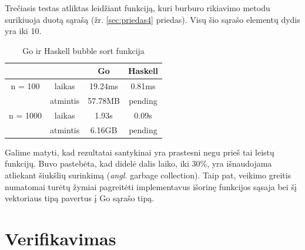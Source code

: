 \documentclass{VUMIFPSkursinis}
\begin{document}
			\par Trečiasis testas atliktas leidžiant funkciją, kuri burburo rikiavimo metodu surikiuoja duotą sąrašą (žr. \ref{sec:priedas4} priedas). Visų šio sąrašo elementų dydis yra iki 10.
			\begin{center}
				\centering
				\begin{table}[h]
					\caption{Go ir Haskell bubble sort funkcija}
					\centering
				\begin{tabular}{ cccc } 
				& & \textbf{Go} & \textbf{Haskell}  \\
				\midrule
				n = 100 & laikas & 19.24ms & 0.81ms    \\
				 & atmintis & 57.78MB & pending  \\
				\midrule
				n = 1000 & laikas & 1.93s & 0.09s  \\
				 & atmintis & 6.16GB & pending \\
				\midrule
				\end{tabular}
				\centering
			\end{table}
				\end{center}
Galime matyti, kad rezultatai santykinai yra prastesni negu prieš tai leistų funkcijų. Buvo pastebėta, kad didelė dalis laiko, iki 30\%, yra išnaudojama atliekant šiukšlių surinkimą (\textit{angl.} garbage collection). Taip pat, veikimo greitis numatomai turėtų žymiai pagreitėti implementavus išorinę funkcijos sąsaja bei šį vektoriaus tipą pavertus į Go sąrašo tipą.
\section{Verifikavimas}
\end{document}
